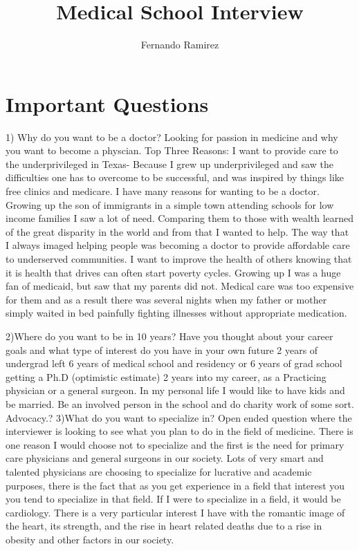 \documentclass[12pt,a4paper,article]{memoir} %
\title{Medical School Interview}
\author{Fernando Ramirez}
\date{} %
\begin{document}
\maketitle
\tableofcontents* %

\chapter{Important Questions}
1) Why do you want to be a doctor? Looking for passion in medicine and why you want to become a physcian.
Top Three Reasons:
	I want to provide care to the underprivileged in Texas- Because I grew up underprivileged and saw the difficulties one has to overcome to be successful, and was inspired by things like free clinics and medicare.
I have many reasons for wanting to be a doctor.  Growing up the son of immigrants in a simple town attending schools for low income families I saw a lot of need.  Comparing them to those with wealth learned of the great disparity in the world and from that I wanted to help.  The way that I always imaged helping people was becoming a doctor to provide affordable care to underserved communities.  
I want to improve the health of others knowing that it is health that drives can often start poverty cycles. Growing up I was a huge fan of medicaid, but saw that my parents did not.  Medical care was too expensive for them and as a result there was several nights when my father or mother simply waited in bed painfully fighting illnesses without appropriate medication.

2)Where do you want to be in 10 years?  Have you thought about your career goals and what type of interest do  you have in your own future
2 years of undergrad left
6 years of medical school and residency or 6 years of grad school getting a Ph.D (optimistic estimate)
2 years into my career, as a Practicing physician or a general surgeon.
In my personal life I would like to have kids and be married.  Be an involved person in the school and do charity work of some sort. Advocacy.?
3)What do you want to specialize in? Open ended question where the interviewer is looking to see what you plan to do in the field of medicine.
There is one reason I would choose not to specialize and the first is the need for primary care physicians and general surgeons in our society.  Lots of very smart and talented physicians are choosing to specialize for lucrative and academic purposes, there is the fact that as you get experience in a field that interest you you tend to specialize in that field.  If I were to specialize in a field, it would be cardiology.  There is a very particular interest I have with the romantic image of the heart, its strength, and the rise in heart related deaths due to a rise in obesity and other factors in our society.
\end{document}
